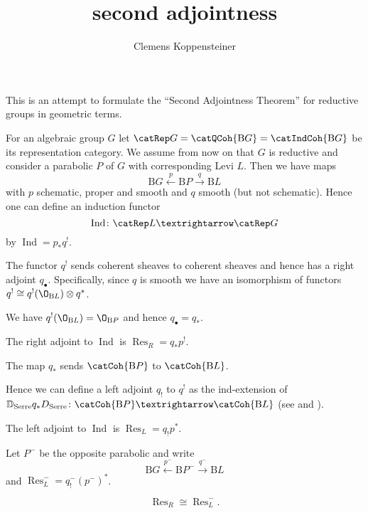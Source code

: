 \documentclass[english]{short-notes}
\title{second adjointness}
\author{Clemens Koppensteiner}
\renewcommand\B{\mathrm{B}}
\newcommand\Ind{\operatorname{Ind}}
\newcommand\Res{\operatorname{Res}}
\begin{document}
\maketitle

This is an attempt to formulate the \enquote{Second Adjointness Theorem} for reductive groups in geometric terms.

For an algebraic group $G$ let $\catRep G = \catQCoh{\B G} = \catIndCoh{\B G}$ be its representation category.
We assume from now on that $G$ is reductive and consider a parabolic $P$ of $G$ with corresponding Levi $L$.
Then we have maps
\[
    \B G \xleftarrow{p} \B P \xrightarrow{q} \B L
\]
with $p$ schematic, proper and smooth and $q$ smooth (but not schematic).
Hence one can define an induction functor
\[
    \Ind\colon \catRep L → \catRep G
\]
by $\Ind = p_*q^!$.

The functor $q^!$ sends coherent sheaves to coherent sheaves \cite[Lemma~7.1.2]{Gaitsgory:preprint:IndcoherentSheaves} and hence has a right adjoint $q_{\bullet}$.
Specifically, since $q$ is smooth we have an isomorphism of functors $q^! \cong q^!(\O_{\B L}) \otimes q^*$.
\begin{Claim}
    We have $q^!(\O_{\B L}) = \O_{\B P}$ and hence $q_\bullet = q_*$.
\end{Claim}

\begin{Cor}
    The right adjoint to $\Ind$ is $\Res_R = q_*p^!$.
\end{Cor}

\begin{Claim}
    The map $q_*$ sends $\catCoh{\B P}$ to $\catCoh{\B L}$.
\end{Claim}

Hence we can define a left adjoint $q_!$ to $q^!$ as the ind-extension of $\mathbb D_{\mathrm{Serre}} q_* \mathbb \mathbb D_{\mathrm{Serre}}\colon \catCoh{\B P} → \catCoh{\B L}$ (see \cite[Corollary~9.5.9(a)]{Gaitsgory:preprint:IndcoherentSheaves} and \cite{Gaitsgory:preprint:GL.DGcat}).

\begin{Cor}
    The left adjoint to $\Ind$ is $\Res_L = q_!p^*$.
\end{Cor}

Let $P^-$ be the opposite parabolic and write
\[
    \B G \xleftarrow{p^-} \B P^- \xrightarrow{q^-} \B L
\]
and $\Res_L^- = q^-_!(p^-)^*$.

\begin{Claim}
    \[
        \Res_R \cong \Res_L^-.
    \]
\end{Claim}
\end{document}
